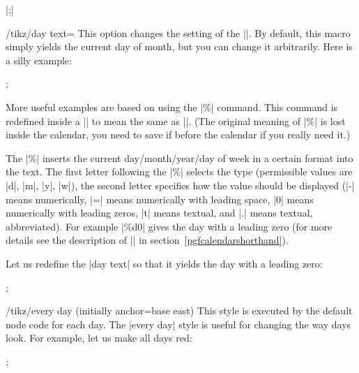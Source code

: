 \begin{command}{\calendar {}|;|}
    \begin{key}{/tikz/day text=}
        This option changes the setting of the |\tikzdaytext|. By default, this
        macro simply yields the current day of month, but you can change it
        arbitrarily. Here is a silly example:
\begin{codeexample}[preamble={\usetikzlibrary{calendar}}]
\tikz \calendar[dates=2000-01-01 to 2000-01-31,week list,
                day text=x];
\end{codeexample}
        More useful examples are based on using the |\%| command. This command
        is redefined inside a |\pgfcalendar| to mean the same as
        |\pgfcalendarshorthand|. (The original meaning of |\%| is lost inside
        the calendar, you need to save if before the calendar if you really
        need it.)

        The |\%| inserts the current day/month/year/day of week in a certain
        format into the text. The first letter following the |\%| selects the
        type (permissible values are |d|, |m|, |y|, |w|), the second letter
        specifies how the value should be displayed (|-| means numerically, |=|
        means numerically with leading space, |0| means numerically with
        leading zeros, |t| means textual, and |.| means textual, abbreviated).
        For example |\%d0| gives the day with a leading zero (for more details
        see the description of |\pgfcalendarshorthand| in section~\ref{pgfcalendarshorthand}).

        Let us redefine the |day text| so that it yields the day with a leading
        zero:
\begin{codeexample}[leave comments,preamble={\usetikzlibrary{calendar}}]
\tikz \calendar[dates=2000-01-01 to 2000-01-31,week list,
                day text=\%d0];
\end{codeexample}
    \end{key}

    \begin{key}{/tikz/every day (initially {anchor=base east})}
        This style is executed by the default node code for each day. The
        |every day| style is useful for changing the way days look. For
        example, let us make all days red:
\begin{codeexample}[leave comments,preamble={\usetikzlibrary{calendar}}]
\tikz[every day/.style=red]
  \calendar[dates=2000-01-01 to 2000-01-31,week list];
\end{codeexample}
    \end{key}



\end{command}
